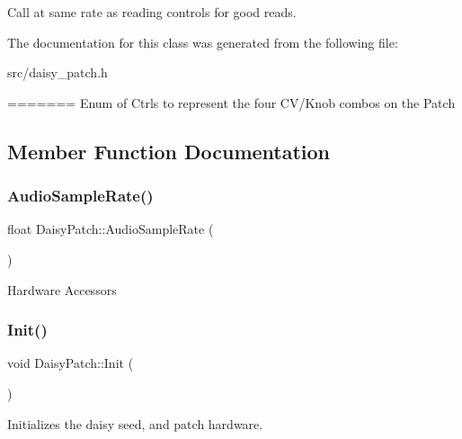 Call at same rate as reading controls for good reads. 

The documentation for this class was generated from the following file\+:\begin{DoxyCompactItemize}
\item 
src/daisy\+\_\+patch.\+h\end{DoxyCompactItemize}
=======
Enum of Ctrls to represent the four C\+V/\+Knob combos on the Patch 

\subsection{Member Function Documentation}
\mbox{\label{classdaisy_1_1_daisy_patch_ab85c5b9dfdbe948e471759a098485223}} 
\subsubsection{\texorpdfstring{Audio\+Sample\+Rate()}{AudioSampleRate()}}
{\footnotesize\ttfamily float Daisy\+Patch\+::\+Audio\+Sample\+Rate (\begin{DoxyParamCaption}{ }\end{DoxyParamCaption})}

Hardware Accessors \mbox{\label{classdaisy_1_1_daisy_patch_ae772fc3a20481cddbebebabc1232d552}} 
\subsubsection{\texorpdfstring{Init()}{Init()}}
{\footnotesize\ttfamily void Daisy\+Patch\+::\+Init (\begin{DoxyParamCaption}{ }\end{DoxyParamCaption})}

Initializes the daisy seed, and patch hardware. \mbox{\label{classdaisy_1_1_daisy_patch_a712e4adb0b23edc20439eaeaab568268}} 
